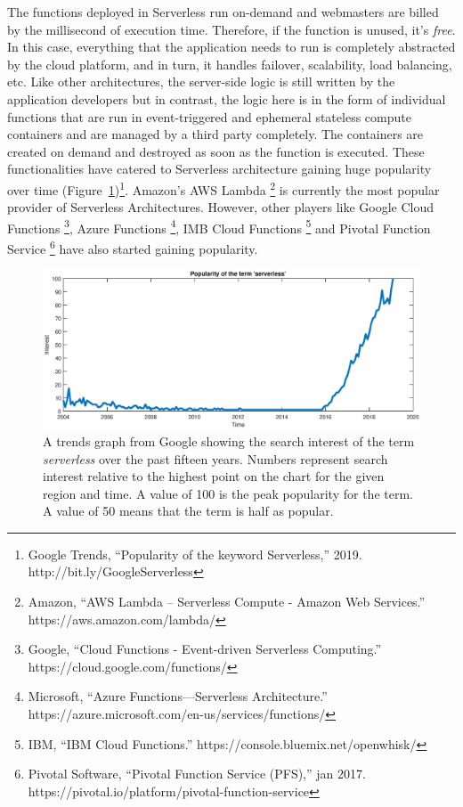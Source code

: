 The functions deployed in Serverless run on-demand and webmasters are billed by the millisecond of execution time. Therefore, if the function is unused, it's \textit{free}. In this case, everything that the application needs to run is completely abstracted by the cloud platform, and in turn, it handles failover, scalability, load balancing, etc. Like other architectures, the server-side logic is still written by the application developers but in contrast, the logic here is in the form of individual functions that are run in event-triggered and ephemeral stateless compute containers and are managed by a third party completely. The containers are created on demand and destroyed as soon as the function is executed. These functionalities have catered to Serverless architecture gaining huge popularity over time (Figure~\ref{fig:ServerlessPopularity})\footnote{Google Trends, “Popularity of the keyword Serverless,” 2019. http://bit.ly/GoogleServerless}. Amazon's AWS Lambda \footnote{Amazon, “AWS Lambda – Serverless Compute - Amazon Web Services.” https://aws.amazon.com/lambda/} is currently the most popular provider of Serverless Architectures. However, other players like Google Cloud Functions \footnote{Google, “Cloud Functions - Event-driven Serverless Computing.”
	https://cloud.google.com/functions/}, Azure Functions \footnote{Microsoft, “Azure Functions—Serverless Architecture.” https://azure.microsoft.com/en-us/services/functions/}, IMB Cloud Functions \footnote{IBM, “IBM Cloud Functions.” https://console.bluemix.net/openwhisk/} and Pivotal Function Service \footnote{Pivotal Software, “Pivotal Function Service (PFS),” jan 2017.
	https://pivotal.io/platform/pivotal-function-service} have also started gaining popularity.

\begin{figure}[h]
	\begin{framed}
		\centering
		\includegraphics[width=\textwidth, trim={2.45cm 0 2.45cm 0},clip]{images/serverless_popularity.eps}
		\caption{A trends graph from Google showing the search interest of the term \textit{serverless} over the past fifteen years. Numbers represent search interest relative to the highest point on the chart for the given region and time. A value of 100 is the peak popularity for the term. A value of 50 means that the term is half as popular.}
		\label{fig:ServerlessPopularity}
		
	\end{framed}
\end{figure}

